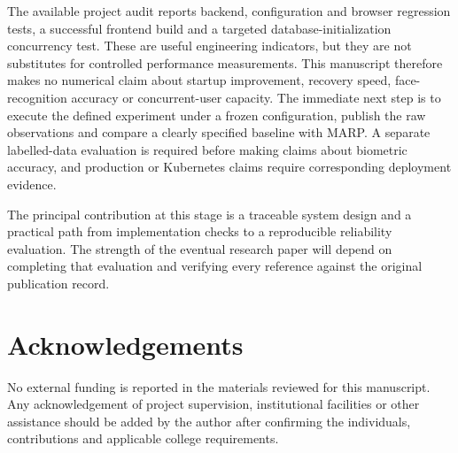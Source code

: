 \documentclass[11pt,a4paper]{article}
\begin{document}
The available project audit reports backend, configuration and browser regression tests, a successful frontend build and a targeted database-initialization concurrency test. These are useful engineering indicators, but they are not substitutes for controlled performance measurements. This manuscript therefore makes no numerical claim about startup improvement, recovery speed, face-recognition accuracy or concurrent-user capacity. The immediate next step is to execute the defined experiment under a frozen configuration, publish the raw observations and compare a clearly specified baseline with MARP. A separate labelled-data evaluation is required before making claims about biometric accuracy, and production or Kubernetes claims require corresponding deployment evidence.

The principal contribution at this stage is a traceable system design and a practical path from implementation checks to a reproducible reliability evaluation. The strength of the eventual research paper will depend on completing that evaluation and verifying every reference against the original publication record.

\section*{Acknowledgements}

No external funding is reported in the materials reviewed for this manuscript. Any acknowledgement of project supervision, institutional facilities or other assistance should be added by the author after confirming the individuals, contributions and applicable college requirements.



\end{document}
